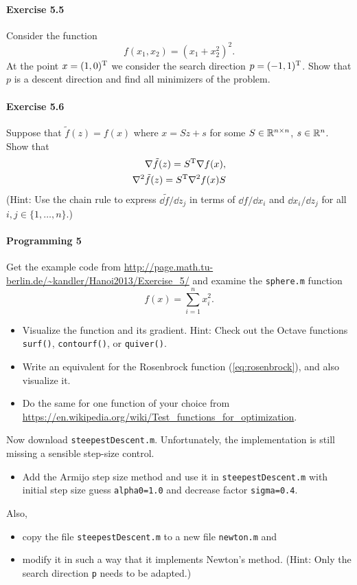 \paragraph{Exercise 5.5} %
Consider the function
\[
  f(x_1, x_2) = (x_1+x_2^2)^2.
\]
At the point $x=(1,0)^{\text{\upshape T}}$ we consider the search direction $p=(-1,1)^{\text{\upshape T}}$.
Show that $p$ is a descent direction and find all minimizers of the problem.

\paragraph{Exercise 5.6} %
Suppose that $\tilde{f}(z) = f(x)$ where $x=Sz + s$ for some $S\in\mathbb{R}^{n\times
n}$, $s\in\mathbb{R}^n$. Show that
\[
  \begin{split}
  \nabla\tilde{f}(z) = S^{\text{\upshape T}} \nabla f(x),\\
  \nabla^2\tilde{f}(z) = S^{\text{\upshape T}} \nabla^2 f(x) S
\end{split}
\]
(Hint: Use the chain rule to express $\dd \tilde{f}/\dd z_j$ in terms of $\dd f/\dd x_i$ and $\dd x_i/\dd z_j$ for all $i, j\in\{1,\dots,n\}$.)

\paragraph{Programming 5}  %
Get the example code from \url{http://page.math.tu-berlin.de/~kandler/Hanoi2013/Exercise_5/} and examine the \texttt{sphere.m} function
\[
  f(x) = \sum_{i=1}^n x_i^2.
\]
\begin{itemize}
  \item Visualize the function and its gradient. Hint: Check out the Octave
    functions \texttt{surf()}, \texttt{contourf()}, or \texttt{quiver()}.
  \item Write an equivalent for the Rosenbrock function (\ref{eq:rosenbrock}), and also visualize it.
  \item Do the same for one function of your choice from
    \url{https://en.wikipedia.org/wiki/Test_functions_for_optimization}.
\end{itemize}

Now download \texttt{steepestDescent.m}. Unfortunately, the implementation is
still missing a sensible step-size control.
\begin{itemize}
  \item Add the Armijo step size method and use it in
    \texttt{steepestDescent.m} with initial step size guess
    \texttt{alpha0=1.0} and decrease factor \texttt{sigma=0.4}.
\end{itemize}
Also,
\begin{itemize}
  \item copy the file \texttt{steepestDescent.m} to a new file
    \texttt{newton.m} and
  \item modify it in such a way that it implements Newton's method.  (Hint:
    Only the search direction \texttt{p} needs to be adapted.)
\end{itemize}

